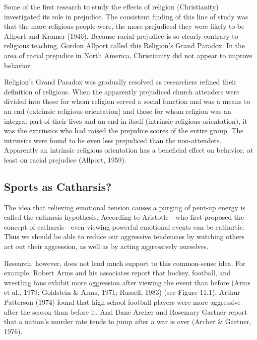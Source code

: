 \documentclass[
]{book}
\begin{document}
Some of the first research to study the effects of religion (Christianity) investigated its role in prejudice. The consistent finding of this line of study was that the more religious people were, the more prejudiced they were likely to be Allport and Kramer (1946). Because racial prejudice is so clearly contrary to religious teaching, Gordon Allport called this Religion's Grand Paradox. In the area of racial prejudice in North America, Christianity did not appear to improve behavior.

Religion's Grand Paradox was gradually resolved as researchers refined their definition of religious. When the apparently prejudiced church attenders were divided into those for whom religion served a social function and was a means to an end (extrinsic religious orientation) and those for whom religion was an integral part of their lives and an end in itself (intrinsic religious orientation), it was the extrinsics who had raised the prejudice scores of the entire group. The intrinsics were found to be even less prejudiced than the non-attenders. Apparently an intrinsic religious orientation has a beneficial effect on behavior, at least on racial prejudice (Allport, 1959).

\hypertarget{sports-as-catharsis}{%
\subsection*{Sports as Catharsis?}\label{sports-as-catharsis}}

The idea that relieving emotional tension causes a purging of pent-up energy is called the catharsis hypothesis. According to Aristotle---who first proposed the concept of catharsis---even viewing powerful emotional events can be cathartic. Thus we should be able to reduce our aggressive tendencies by watching others act out their aggression, as well as by acting aggressively ourselves.

Research, however, does not lend much support to this common-sense idea. For example, Robert Arms and his associates report that hockey, football, and wrestling fans exhibit more aggression after viewing the event than before (Arms et al., 1979; Goldstein \& Arms, 1971; Russell, 1983) (see Figure 11.1). Arthur Patterson (1974) found that high school football players were more aggressive after the season than before it. And Dane Archer and Rosemary Gartner report that a nation's murder rate tends to jump after a war is over (Archer \& Gartner, 1976).
\end{document}
